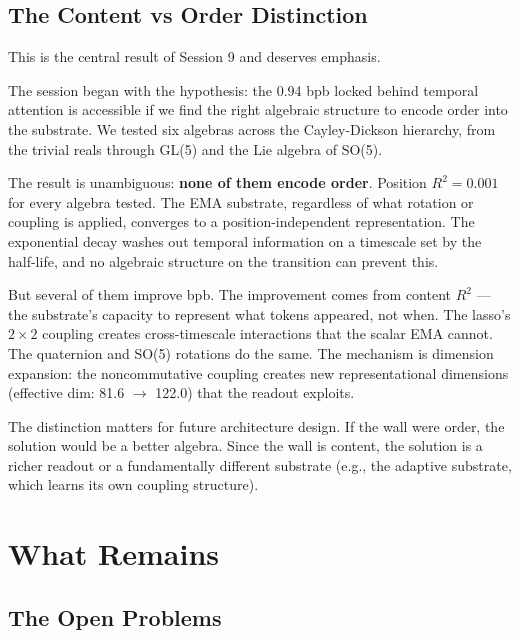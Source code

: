 \documentclass[11pt,a4paper]{report}
\begin{document}
\section{The Content vs Order Distinction}

This is the central result of Session 9 and deserves emphasis.

The session began with the hypothesis: the 0.94 bpb locked behind temporal attention \cite{session7} is accessible if we find the right algebraic structure to encode order into the substrate. We tested six algebras across the Cayley-Dickson hierarchy, from the trivial reals through GL(5) and the Lie algebra of SO(5).

The result is unambiguous: \textbf{none of them encode order}. Position $R^2 = 0.001$ for every algebra tested. The EMA substrate, regardless of what rotation or coupling is applied, converges to a position-independent representation. The exponential decay washes out temporal information on a timescale set by the half-life, and no algebraic structure on the transition can prevent this.

But several of them improve bpb. The improvement comes from content $R^2$ --- the substrate's capacity to represent what tokens appeared, not when. The lasso's $2 \times 2$ coupling creates cross-timescale interactions that the scalar EMA cannot. The quaternion and SO(5) rotations do the same. The mechanism is dimension expansion: the noncommutative coupling creates new representational dimensions (effective dim: 81.6 $\to$ 122.0) that the readout exploits.

The distinction matters for future architecture design. If the wall were order, the solution would be a better algebra. Since the wall is content, the solution is a richer readout or a fundamentally different substrate (e.g., the adaptive substrate, which learns its own coupling structure).


\chapter{What Remains}

\section{The Open Problems}
\end{document}
